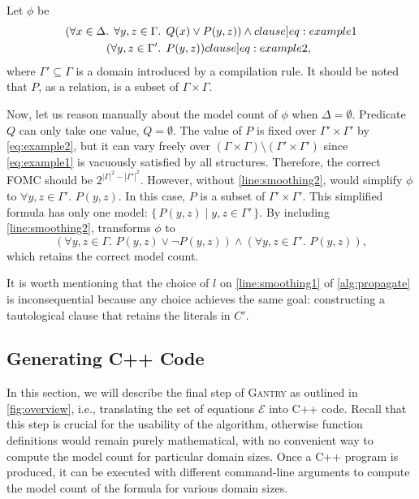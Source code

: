 \documentclass[a4paper,UKenglish,cleveref, autoref, thm-restate]{lipics-v2021}
\newcommand{\Cranetwo}{\textsc{Gantry}}
\begin{document}
\begin{example}\label{example:basecasesmoothing}
  Let $\phi$ be
  \begin{align}
    (\forall x \in \Delta\text{. }\forall y, z \in \Gamma&\text{. }Q(x) \lor P(y, z))\land{}\label[clause]{eq:example1}\\
    (\forall y, z \in \Gamma'&\text{. }P(y, z))\label[clause]{eq:example2},
  \end{align}
  where $\Gamma' \subseteq \Gamma$ is a domain introduced by a compilation rule.
  It should be noted that $P$, as a relation, is a subset of
  $\Gamma \times \Gamma$.

  Now, let us reason manually about the model count of $\phi$ when
  $\Delta = \emptyset$. Predicate $Q$ can only take one value, $Q = \emptyset$.
  The value of $P$ is fixed over $\Gamma' \times \Gamma'$ by \cref{eq:example2},
  but it can vary freely over
  $(\Gamma \times \Gamma) \setminus (\Gamma' \times \Gamma')$ since
  \cref{eq:example1} is vacuously satisfied by all structures. Therefore, the
  correct FOMC should be $2^{|\Gamma|^2 - |\Gamma'|^2}$. However, without
  \autoref{line:smoothing2}, \Propagate would simplify $\phi$ to
  $\forall y, z \in \Gamma'\text{. }P(y, z)$. In this case, $P$ is a subset of
  $\Gamma' \times \Gamma'$. This simplified formula has only one model:
  $\{\, P(y, z) \mid y, z \in \Gamma' \,\}$. By including
  \autoref{line:smoothing2}, \Propagate transforms $\phi$ to
  \[
    (\forall y, z \in \Gamma\text{. }P(y, z) \lor \neg P(y, z)) \land (\forall y, z \in \Gamma'\text{. }P(y, z)),
  \]
  which retains the correct model count.
\end{example}

It is worth mentioning that the choice of $l$ on \autoref{line:smoothing1} of
\cref{alg:propagate} is inconsequential because any choice achieves the same
goal: constructing a tautological clause that retains the literals in $C'$.

\subsection{Generating C++ Code}\label{sec:cpp}

In this section, we will describe the final step of \Cranetwo{} as outlined in
\cref{fig:overview}, i.e., translating the set of equations $\mathcal{E}$ into
C++ code. Recall that this step is crucial for the usability of the algorithm,
otherwise function definitions would remain purely mathematical, with no
convenient way to compute the model count for particular domain sizes. Once a
C++ program is produced, it can be executed with different command-line
arguments to compute the model count of the formula for various domain sizes.
\end{document}
